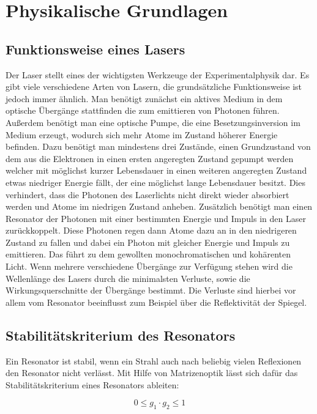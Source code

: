 \section{Physikalische Grundlagen}

\subsection{Funktionsweise eines Lasers}


Der Laser stellt eines der wichtigsten Werkzeuge der Experimentalphysik dar. Es gibt viele verschiedene Arten von Lasern, die grundsätzliche Funktionsweise ist jedoch immer ähnlich. Man benötigt zunächst ein aktives Medium in dem optische Übergänge stattfinden die zum emittieren von Photonen führen. Außerdem benötigt man eine optische Pumpe, die eine Besetzungsinversion im Medium erzeugt, wodurch sich mehr Atome im Zustand höherer Energie befinden. Dazu benötigt man mindestens drei Zustände, einen Grundzustand von dem aus die Elektronen in einen ersten angeregten Zustand gepumpt werden welcher mit möglichst kurzer Lebensdauer in einen weiteren angeregten Zustand etwas niedriger Energie fällt, der eine möglichst lange Lebensdauer besitzt. Dies verhindert, dass die Photonen des Laserlichts nicht direkt wieder absorbiert werden und Atome im niedrigen Zustand anheben. Zusätzlich benötigt man einen Resonator der Photonen mit einer bestimmten Energie und Impuls in den Laser zurückkoppelt. Diese Photonen regen dann Atome dazu an in den niedrigeren Zustand zu fallen und dabei ein Photon mit gleicher Energie und Impuls zu emittieren. Das führt zu dem gewollten monochromatischen und kohärenten Licht.
Wenn mehrere verschiedene Übergänge zur Verfügung stehen wird die Wellenlänge des Lasers durch die minimalsten Verluste, sowie die Wirkungsquerschnitte der Übergänge bestimmt. Die Verluste sind hierbei vor allem vom Resonator beeinflusst zum Beispiel über die Reflektivität der Spiegel.



\subsection{Stabilitätskriterium des Resonators}


Ein Resonator ist stabil, wenn ein Strahl auch nach beliebig vielen Reflexionen den Resonator nicht verlässt. 
Mit Hilfe von Matrizenoptik lässt sich dafür das Stabilitätskriterium eines Resonators
ableiten:

\begin{equation}
0\leq g_1 \cdot g_2 \leq 1
\end{equation}

